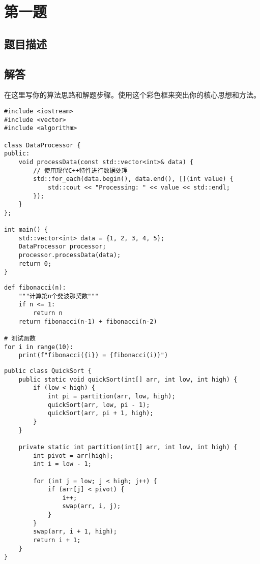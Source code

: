 \documentclass[12pt,a4paper]{article}
\numberwithin{equation}{section}
\newenvironment{solution}
{\begin{tcolorbox}[colback=pkured!5,colframe=pkured,title=算法思路,fonttitle=\bfseries\color{white}]}
{\end{tcolorbox}}
\begin{document}
\tableofcontents
\newpage


\section{第一题}

\subsection{题目描述}

\subsection{解答}

\begin{solution}
在这里写你的算法思路和解题步骤。使用这个彩色框来突出你的核心思想和方法。
\end{solution}

\begin{lstlisting}[style=vscode, caption=VS Code风格代码示例]
#include <iostream>
#include <vector>
#include <algorithm>

class DataProcessor {
public:
    void processData(const std::vector<int>& data) {
        // 使用现代C++特性进行数据处理
        std::for_each(data.begin(), data.end(), [](int value) {
            std::cout << "Processing: " << value << std::endl;
        });
    }
};

int main() {
    std::vector<int> data = {1, 2, 3, 4, 5};
    DataProcessor processor;
    processor.processData(data);
    return 0;
}
\end{lstlisting}

\begin{lstlisting}[style=github, caption=GitHub风格代码示例]
def fibonacci(n):
    """计算第n个斐波那契数"""
    if n <= 1:
        return n
    return fibonacci(n-1) + fibonacci(n-2)

# 测试函数
for i in range(10):
    print(f"fibonacci({i}) = {fibonacci(i)}")
\end{lstlisting}

\begin{lstlisting}[style=minimal, caption=极简风格代码示例]
public class QuickSort {
    public static void quickSort(int[] arr, int low, int high) {
        if (low < high) {
            int pi = partition(arr, low, high);
            quickSort(arr, low, pi - 1);
            quickSort(arr, pi + 1, high);
        }
    }

    private static int partition(int[] arr, int low, int high) {
        int pivot = arr[high];
        int i = low - 1;

        for (int j = low; j < high; j++) {
            if (arr[j] < pivot) {
                i++;
                swap(arr, i, j);
            }
        }
        swap(arr, i + 1, high);
        return i + 1;
    }
}
\end{lstlisting}
\end{document}
